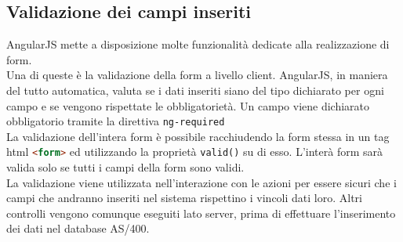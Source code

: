 \subsection{Validazione dei campi inseriti}

AngularJS mette a disposizione molte funzionalità dedicate alla realizzazione di form.\\
Una di queste è la validazione della form a livello client. AngularJS, in maniera del tutto automatica, valuta se i dati inseriti siano del tipo dichiarato per ogni campo e se vengono rispettate le obbligatorietà. Un campo viene dichiarato obbligatorio tramite la direttiva \lstinline[language=HTML]!ng-required! \\
La validazione dell'intera form è possibile racchiudendo la form stessa in un tag \gls{html} \lstinline[language=HTML]!<form>! ed utilizzando la proprietà \lstinline[language=HTML]!valid()! su di esso. L'interà form sarà valida solo se tutti i campi della form sono validi.	\\
La validazione viene utilizzata nell'interazione con le azioni per essere sicuri che i campi che andranno inseriti nel sistema rispettino i vincoli dati loro. Altri controlli vengono comunque eseguiti lato server, prima di effettuare l'inserimento dei dati nel database AS/400.


